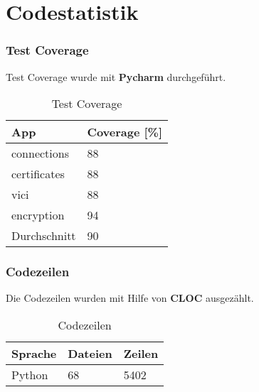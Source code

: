 \section{Codestatistik}
\subsubsection{Test Coverage}
Test Coverage wurde mit \textbf{Pycharm} durchgeführt. \\

\begin{table}[H]
\centering
    \begin{tabular}{|p{6cm}|p{6cm}|}
    \hline    
    \rowcolor{lightblue}
	App & Coverage [\%] \\ \hline
	connections & 88 \\ \hline    
	certificates & 88 \\ \hline   
	vici & 88 \\ \hline  
	encryption & 94 \\ \hline  
	\rowcolor{lightblue}
	Durchschnitt &   90 \\ \hline
    \end{tabular}
    \caption[Test Coverage]{Test Coverage}
\end{table}

\subsubsection{Codezeilen}
Die Codezeilen wurden mit Hilfe von \textbf{CLOC} \cite{CLOC} ausgezählt. \\

\begin{table}[H]
\centering
    \begin{tabular}{|p{3cm} |p{3cm} |p{3cm} |}
    \hline    
    \rowcolor{lightblue}
	Sprache & Dateien & Zeilen  \\ \hline   
	Python & 68 & 5402 \\ \hline
    \end{tabular}
    \caption[Codezeilen]{Codezeilen}
\end{table}

